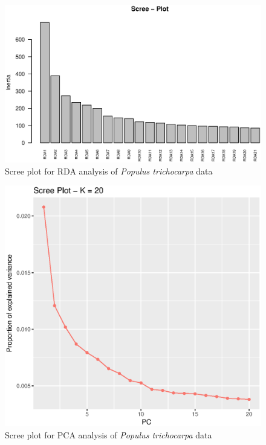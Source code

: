 \documentclass[a4paper,times,10pt,authoryear]{article}%
\begin{document}
\begin{figure}[t]
\begin{center}
\includegraphics[height=0.25\textheight]{figures/screeplot-rda.eps}
\end{center}
\caption{Scree plot for RDA analysis of \textit{Populus trichocarpa} data}%
\label{fig:screeplotrda}%
\end{figure}


\begin{figure}[t]
\begin{center}
\includegraphics[height=0.25\textheight]{figures/screeplot-pca.eps}
\end{center}
\caption{Scree plot for PCA analysis of \textit{Populus trichocarpa} data}%
\label{fig:screeplotpca}%
\end{figure}
\end{document}
